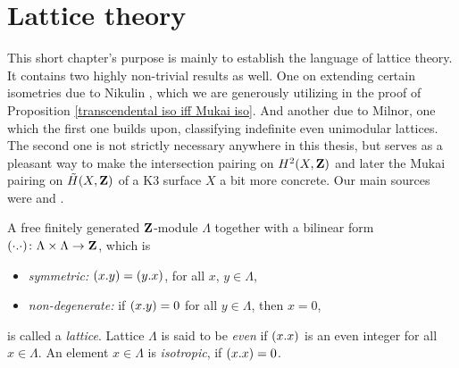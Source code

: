 \section{Lattice theory}
\label{appendix B}

This short chapter's purpose is mainly to establish the language of lattice theory. It contains two highly non-trivial results as well. One on extending certain isometries due to Nikulin \cite{Nikulin1980}, which we are generously utilizing in the proof of Proposition \ref{transcendental iso iff Mukai iso}. And another due to Milnor, one which the first one builds upon, classifying indefinite even unimodular lattices. The second one is not strictly necessary anywhere in this thesis, but serves as a pleasant way to make the intersection pairing on $H^{2}(X, \mathbf Z)$ and later the Mukai pairing on $\,\tilde{\!{H}}(X, \mathbf Z)$ of a K3 surface $X$ a bit more concrete. Our main sources were \cite[\S 14]{Huybrechts2016} and \cite{Nikulin1980}.

\begin{definition}
    A free finitely generated $\mathbf Z$-module $\Lambda$ together with a bilinear form $(\cdot.\cdot) \colon \Lambda \times \Lambda \to \mathbf Z$, which is
    \begin{itemize}
        \item \emph{symmetric:} $(x.y) = (y.x)$, for all $x$, $y \in \Lambda$,
        \item \emph{non-degenerate:} if $(x.y) = 0$ for all $y \in \Lambda$, then $x = 0$,
    \end{itemize}
    is called a \emph{lattice}. Lattice $\Lambda$ is said to be \emph{even} if $(x.x)$ is an even integer for all $x \in \Lambda$. An element $x \in \Lambda$ is \emph{isotropic}, if $(x.x) = 0$.
\end{definition}

